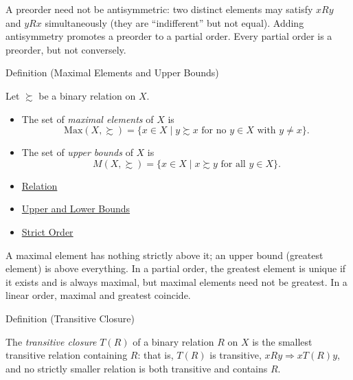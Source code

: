 \begin{remark*}
A preorder need not be antisymmetric: two distinct elements may satisfy
$xRy$ and $yRx$ simultaneously (they are ``indifferent'' but not equal).
Adding antisymmetry promotes a preorder to a partial order. Every partial
order is a preorder, but not conversely.
\end{remark*}

\begin{definitionbox}{Definition (Maximal Elements and Upper Bounds)}
\begin{definition}\label{def:maximal-upper}
Let $\succsim$ be a binary relation on $X$.
\begin{itemize}
  \item The set of \emph{maximal elements} of $X$ is
    \[
      \mathrm{Max}(X, \succsim)
      = \{ x \in X \mid y \succsim x \text{ for no } y \in X \text{ with }
          y \neq x \}.
    \]
  \item The set of \emph{upper bounds} of $X$ is
    \[
      M(X, \succsim)
      = \{ x \in X \mid x \succsim y \text{ for all } y \in X \}.
    \]
\end{itemize}
\end{definition}
\end{definitionbox}

\begin{dependencies}
\begin{itemize}
  \item \hyperref[def:relation]{Relation}
  \item \hyperref[def:bounds]{Upper and Lower Bounds}
  \item \hyperref[def:strict-order]{Strict Order}
\end{itemize}
\end{dependencies}

\begin{remark*}
A maximal element has nothing strictly above it; an upper bound (greatest
element) is above everything. In a partial order, the greatest element is
unique if it exists and is always maximal, but maximal elements need not be
greatest. In a linear order, maximal and greatest coincide.
\end{remark*}

\begin{definitionbox}{Definition (Transitive Closure)}
\begin{definition}\label{def:trans-closure}
The \emph{transitive closure} $T(R)$ of a binary relation $R$ on $X$ is the
smallest transitive relation containing $R$: that is, $T(R)$ is transitive,
$xRy \Rightarrow xT(R)y$, and no strictly smaller relation is both transitive
and contains $R$.
\end{definition}
\end{definitionbox}

